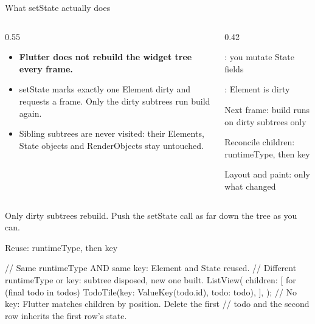 \documentclass[10pt,aspectratio=169,t]{beamer}
\begin{document}
\begin{frame}[eyebrow=State]{What setState actually does}
  \begin{columns}[T]
    \begin{column}{0.55\textwidth}
      \begin{itemize}
        \item[] \textbf{Flutter does not rebuild the widget tree every frame.}
        \item setState marks exactly one Element dirty and requests a frame. Only the dirty subtrees run build again.
        \item Sibling subtrees are never visited: their Elements, State objects and RenderObjects stay untouched.
      \end{itemize}
    \end{column}
    \begin{column}{0.42\textwidth}
      \begin{steps}
        \item {}: you mutate State fields
        \item {}: Element is dirty
        \item Next frame: build runs on dirty subtrees only
        \item Reconcile children: runtimeType, then key
        \item Layout and paint: only what changed
      \end{steps}
    \end{column}
  \end{columns}
  \begin{takeaway}{Only dirty subtrees rebuild.}
    Push the setState call as far down the tree as you can.
  \end{takeaway}
\end{frame}

\begin{frame}[fragile,eyebrow=State]{Reuse: runtimeType, then key}
\begin{dart}
// Same runtimeType AND same key: Element and State reused.
// Different runtimeType or key: subtree disposed, new one built.
ListView(
  children: [
    for (final todo in todos)
      TodoTile(key: ValueKey(todo.id), todo: todo),
  ],
);
// No key: Flutter matches children by position. Delete the first
// todo and the second row inherits the first row's state.
\end{dart}
\end{frame}
\end{document}
